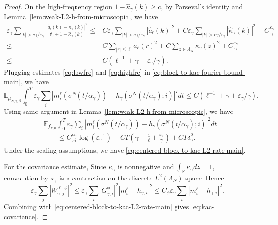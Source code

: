 \documentclass{article}
\begin{document}
\begin{proof}
On the high-frequency region \(1-\widehat\kappa_\gamma(k)\ge c\), by Parseval's identity and Lemma~\ref{lem:weak-L2-h-from-microscopic}, we have
\begin{align}\label{eq:highfre}
    \varepsilon_\gamma \sum_{|k|>c\gamma/\varepsilon_\gamma}
\frac{\left|\widehat a_\ell(k)-\widehat\kappa_\gamma(k)\right|^2}{\theta_\gamma+1-\widehat\kappa_\gamma(k)}  \le & C\varepsilon_\gamma\sum_{|k|>c\gamma/\varepsilon_\gamma}|\widehat a_\ell(k)|^2
+C\varepsilon_\gamma\sum_{|k|>c\gamma/\varepsilon_\gamma}|\widehat\kappa_\gamma(k)|^2
+C\frac{\varepsilon_\gamma}{\gamma} \nonumber \\
\le & C \sum_{|r|\le\ell}a_\ell(r)^2 + C \sum_{z \in \Lambda_N}\kappa_\gamma(z)^2 +C\frac{\varepsilon_\gamma}{\gamma} \nonumber \\
\le & C(\ell^{-1}+\gamma+\varepsilon_\gamma/\gamma).
\end{align}
Plugging estimates \eqref{eq:lowfre} and \eqref{eq:highfre} in \eqref{eq:block-to-kac-fourier-bound-main}, we have 
\begin{equation}
    \mathbb E_{\mu_{N,\gamma,\beta}}\int_0^T \varepsilon_\gamma\sum_i \left|m_i^\ell(\sigma^N(t/\alpha_\gamma)) -h_\gamma(\sigma^N(t/\alpha_\gamma);i)\right|^2dt \le C(\ell^{-1}+\gamma+\varepsilon_\gamma/\gamma).
\end{equation}
Using same argument in Lemma~\ref{lem:weak-L2-h-from-microscopic}, we have 
\begin{align}
      &  \mathbb E_{f_{N,0}}\int_0^T
\varepsilon_\gamma\sum_i
\left|
 m_i^\ell(\sigma^N(t/\alpha_\gamma))
-h_\gamma(\sigma^N(t/\alpha_\gamma);i)
\right|^2dt \nonumber\\
& \qquad \le
C\frac{\alpha_\gamma}{\varepsilon_\gamma^{2}}\log(\varepsilon_\gamma^{-1})
+CT\left(\gamma+\frac1\ell+\frac{\varepsilon_\gamma}{\gamma}\right)
+CT \delta^2_{\gamma}.
\end{align}
Under the scaling assumptions, we have \eqref{eq:centered-block-to-kac-L2-rate-main}.

For the covariance estimate, Since
\(\kappa_\gamma\) is nonnegative and $\int_{\mathbb R} \kappa_\gamma dz = 1$, convolution by
\(\kappa_\gamma\) is a contraction on the discrete
\(L^2(\Lambda_N)\) space.  
Hence
\[
\varepsilon_\gamma\sum_j|W_{\gamma,j}^{\ell,\phi}|^2
\le
\varepsilon_\gamma\sum_i
\left|G_{\gamma,i}^{\phi}\right|^2
\left|m_i^\ell-h_{\gamma,i}\right|^2
\le
C_\phi
\varepsilon_\gamma\sum_i
\left|m_i^\ell-h_{\gamma,i}\right|^2.
\]
Combining with \eqref{eq:centered-block-to-kac-L2-rate-main} gives \eqref{eq:kac-covariance}.
\end{proof}
\end{document}
